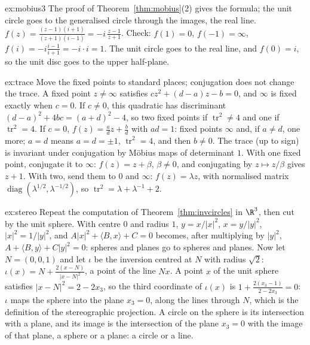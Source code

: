 \begin{solution}{ex:mobius3}
\idea The proof of Theorem~\ref{thm:mobius}(2) gives the formula; the unit circle goes to the generalised circle through the images, the real line.
\writeup $f(z)=\frac{(z-1)(i+1)}{(z+1)(i-1)}=-i\,\frac{z-1}{z+1}$. Check: $f(1)=0$, $f(-1)=\infty$, $f(i)=-i\frac{i-1}{i+1}=-i\cdot i=1$. The unit circle goes
to the real line, and $f(0)=i$, so the unit disc goes to the upper half-plane.
\end{solution}

\begin{solution}{ex:trace}
\idea Move the fixed points to standard places; conjugation does not change the trace.
\writeup A fixed point $z\ne\infty$ satisfies $cz^2+(d-a)z-b=0$, and $\infty$ is fixed exactly when $c=0$. If $c\ne0$, this quadratic has
discriminant $(d-a)^2+4bc=(a+d)^2-4$, so two fixed points if $\operatorname{tr}^2\ne4$ and one if $\operatorname{tr}^2=4$. If $c=0$, $f(z)=\frac adz+\frac bd$ with
$ad=1$: fixed points $\infty$ and, if $a\ne d$, one more; $a=d$ means $a=d=\pm1$, $\operatorname{tr}^2=4$, and then $b\ne0$. The trace (up to sign) is
invariant under conjugation by M\"obius maps of determinant $1$. With one fixed point, conjugate it to $\infty$: $f(z)=z+\beta$, $\beta\ne0$, and
conjugating by $z\mapsto z/\beta$ gives $z+1$. With two, send them to $0$ and $\infty$: $f(z)=\lambda z$, with normalised matrix
$\operatorname{diag}(\lambda^{1/2},\lambda^{-1/2})$, so $\operatorname{tr}^2=\lambda+\lambda^{-1}+2$.
\end{solution}

\begin{solution}{ex:stereo}
\idea Repeat the computation of Theorem~\ref{thm:invcircles} in $\R^3$, then cut by the unit sphere.
\writeup With centre $0$ and radius $1$, $y=x/|x|^2$, $x=y/|y|^2$, $|x|^2=1/|y|^2$, and $A|x|^2+\langle B,x\rangle+C=0$ becomes, after multiplying by $|y|^2$,
$A+\langle B,y\rangle+C|y|^2=0$: spheres and planes go to spheres and planes. Now let $N=(0,0,1)$ and let $\iota$ be the inversion centred at $N$ with
radius $\sqrt2$: $\iota(x)=N+\frac{2(x-N)}{|x-N|^2}$, a point of the line $Nx$. A point $x$ of the unit sphere satisfies $|x-N|^2=2-2x_3$, so the
third coordinate of $\iota(x)$ is $1+\frac{2(x_3-1)}{2-2x_3}=0$: $\iota$ maps the sphere into the plane $x_3=0$, along the lines through $N$, which is
the definition of the stereographic projection. A
circle on the sphere is its intersection with a plane, and its image is the intersection of the plane $x_3=0$ with the image of that plane, a sphere
or a plane: a circle or a line.
\end{solution}

